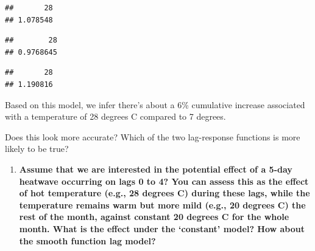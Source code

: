 \documentclass[
]{book}
\newenvironment{Shaded}{\begin{snugshade}}{\end{snugshade}}
\newcommand{\DecValTok}[1]{\textcolor[rgb]{0.00,0.00,0.81}{#1}}
\newcommand{\NormalTok}[1]{#1}
\newcommand{\SpecialCharTok}[1]{\textcolor[rgb]{0.00,0.00,0.00}{#1}}
\providecommand{\tightlist}{%
  \setlength{\itemsep}{0pt}\setlength{\parskip}{0pt}}
\begin{document}
\begin{verbatim}
##       28 
## 1.078548
\end{verbatim}

\begin{Shaded}
\end{Shaded}

\begin{verbatim}
##        28 
## 0.9768645
\end{verbatim}

\begin{Shaded}
\end{Shaded}

\begin{verbatim}
##       28 
## 1.190816
\end{verbatim}

Based on this model, we infer there's about a 6\% cumulative increase associated with a
temperature of 28 degrees C compared to 7 degrees.

Does this look more accurate? Which of the two lag-response functions is more likely to be true?

\begin{enumerate}
\def\labelenumi{\arabic{enumi}.}
\setcounter{enumi}{3}
\tightlist
\item
  \textbf{Assume that we are interested in the potential effect of a 5-day
  heatwave occurring on lags 0 to 4? You can assess this as the effect of hot temperature
  (e.g., 28 degrees C) during these lags, while the temperature remains warm but more
  mild (e.g., 20 degrees C) the rest of the month, against constant 20 degrees C for
  the whole month. What is the effect under the `constant' model? How about the smooth
  function lag model?}
\end{enumerate}
\end{document}
